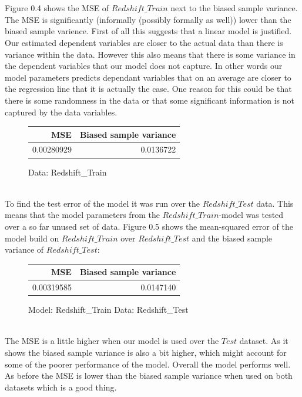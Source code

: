 \documentclass[a4paper,danish,8pt,oneside,openany]{memoir}
\begin{document}
\\
\\
Figure 0.4 shows the MSE of $Redshift\_Train$ next to the biased sample variance. The MSE is significantly (informally (possibly formally as well)) lower than the biased sample varience. First of all this suggests that a linear model is justified. Our estimated dependent variables are closer to the actual data than there is variance within the data. However this also means that there is some variance in the dependent variables that our model does not capture. In other words our model parameters predicts dependant variables that on an average are closer to the regression line that it is actually the case. One reason for this could be that there is some randomness in the data or that some significant information is not captured by the data variables.
\\
\begin{figure}[!h]
\centering
\begin{tabular}{|r|r|}
\hline
\textbf{MSE} & \textbf{Biased sample variance}\\ \hline
0.00280929 & 0.0136722 \\ \hline
\end{tabular}
\caption{Data: Redshift\_Train}
\end{figure}
\\
To find the test error of the model it was run over the $Redshift\_Test$ data. This means that the model parameters from the $Redshift\_Train$-model was tested over a so far unused set of data. Figure 0.5 shows the mean-squared error of the model build on $Redshift\_Train$ over $Redshift\_Test$ and the biased sample variance of $Redshift\_Test$:
\\
\begin{figure}[!h]
\centering
\begin{tabular}{|r|r|}
\hline
\textbf{MSE} & \textbf{Biased sample variance}\\ \hline
0.00319585 & 0.0147140 \\ \hline
\end{tabular}
\caption{Model: Redshift\_Train Data: Redshift\_Test}
\end{figure}
\\
The MSE is a little higher when our model is used over the $Test$ dataset. As it shows the biased sample variance is also a bit higher, which might account for some of the poorer performance of the model. Overall the model performs well. As before the MSE is lower than the biased sample variance when used on both datasets which is a good thing.
\newpage
%
%
\end{document}
